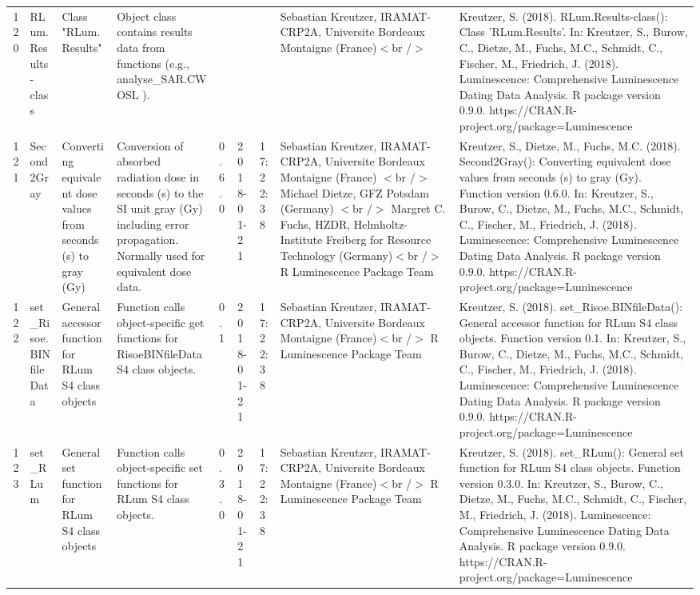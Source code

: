 \begin{table}[ht]
\begin{tabular}{rllllllll}
 \\ 
  120 & RLum.Results-class & Class  "RLum.Results" & Object class contains results data from functions (e.g.,  analyse\_SAR.CWOSL ). &  &  &  & Sebastian Kreutzer, IRAMAT-CRP2A, Universite Bordeaux Montaigne (France)$<$br /$>$ & Kreutzer, S. (2018). RLum.Results-class(): Class 'RLum.Results'. In: Kreutzer, S., Burow, C., Dietze, M., Fuchs, M.C., Schmidt, C., Fischer, M., Friedrich, J. (2018). Luminescence: Comprehensive Luminescence Dating Data Analysis. R package version 0.9.0. https://CRAN.R-project.org/package=Luminescence
 \\ 
  121 & Second2Gray & Converting equivalent dose values from seconds (s) to gray (Gy) & Conversion of absorbed radiation dose in seconds (s) to the SI unit gray (Gy) including error propagation. Normally used for equivalent dose data. & 0.6.0 & 2018-01-21 & 17:22:38
 & Sebastian Kreutzer, IRAMAT-CRP2A, Universite Bordeaux Montaigne (France) $<$br /$>$ Michael Dietze, GFZ Potsdam (Germany) $<$br /$>$ Margret C. Fuchs, HZDR, Helmholtz-Institute Freiberg for Resource Technology (Germany)$<$br /$>$  R Luminescence Package Team & Kreutzer, S., Dietze, M., Fuchs, M.C. (2018). Second2Gray(): Converting equivalent dose values from seconds (s) to gray (Gy). Function version 0.6.0. In: Kreutzer, S., Burow, C., Dietze, M., Fuchs, M.C., Schmidt, C., Fischer, M., Friedrich, J. (2018). Luminescence: Comprehensive Luminescence Dating Data Analysis. R package version 0.9.0. https://CRAN.R-project.org/package=Luminescence
 \\ 
  122 & set\_Risoe.BINfileData & General accessor function for RLum S4 class objects & Function calls object-specific get functions for RisoeBINfileData S4 class objects. & 0.1 & 2018-01-21 & 17:22:38
 & Sebastian Kreutzer, IRAMAT-CRP2A, Universite Bordeaux Montaigne (France)$<$br /$>$  R Luminescence Package Team & Kreutzer, S. (2018). set\_Risoe.BINfileData(): General accessor function for RLum S4 class objects. Function version 0.1. In: Kreutzer, S., Burow, C., Dietze, M., Fuchs, M.C., Schmidt, C., Fischer, M., Friedrich, J. (2018). Luminescence: Comprehensive Luminescence Dating Data Analysis. R package version 0.9.0. https://CRAN.R-project.org/package=Luminescence
 \\ 
  123 & set\_RLum & General set function for RLum S4 class objects & Function calls object-specific set functions for RLum S4 class objects. & 0.3.0 & 2018-01-21 & 17:22:38
 & Sebastian Kreutzer, IRAMAT-CRP2A, Universite Bordeaux Montaigne (France)$<$br /$>$  R Luminescence Package Team & Kreutzer, S. (2018). set\_RLum(): General set function for RLum S4 class objects. Function version 0.3.0. In: Kreutzer, S., Burow, C., Dietze, M., Fuchs, M.C., Schmidt, C., Fischer, M., Friedrich, J. (2018). Luminescence: Comprehensive Luminescence Dating Data Analysis. R package version 0.9.0. https://CRAN.R-project.org/package=Luminescence

\end{tabular}
\end{table}
